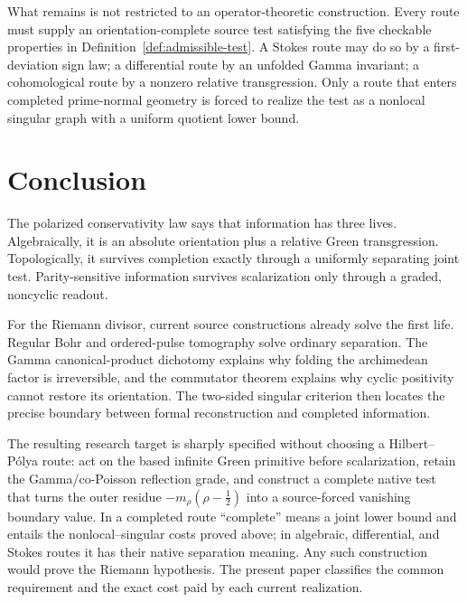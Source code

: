 \documentclass[11pt]{article}
\theoremstyle{definition}
\theoremstyle{remark}
\begin{document}
What remains is not restricted to an operator-theoretic construction.
Every route must supply an orientation-complete source test satisfying the
five checkable properties in Definition~\ref{def:admissible-test}.  A Stokes
route may do so by a first-deviation sign law; a differential route by an
unfolded Gamma invariant; a cohomological route by a nonzero relative
transgression.  Only a route that enters completed prime-normal geometry is
forced to realize the test as a nonlocal singular graph with a uniform
quotient lower bound.

\section{Conclusion}

The polarized conservativity law says that information has three lives.
Algebraically, it is an absolute orientation plus a relative Green
transgression.  Topologically, it survives completion exactly through a
uniformly separating joint test.  Parity-sensitive information survives
scalarization only through a graded, noncyclic readout.

For the Riemann divisor, current source constructions already solve the
first life.  Regular Bohr and ordered-pulse tomography solve ordinary
separation.  The Gamma canonical-product dichotomy explains why folding the
archimedean factor is irreversible, and the commutator theorem explains why
cyclic positivity cannot restore its orientation.  The two-sided singular
criterion then locates the precise boundary between formal reconstruction
and completed information.

The resulting research target is sharply specified without choosing a
Hilbert--P\'olya route: act on the based infinite Green primitive before
scalarization, retain the Gamma/co-Poisson reflection grade, and construct a
complete native test that turns the outer residue
\(-m_\rho(\rho-\tfrac12)\) into a source-forced vanishing boundary value.
In a completed route ``complete'' means a joint lower bound and entails the
nonlocal--singular costs proved above; in algebraic, differential, and Stokes
routes it has their native separation meaning.  Any such construction would
prove the Riemann hypothesis.  The present paper classifies the common
requirement and the exact cost paid by each current realization.
\end{document}
